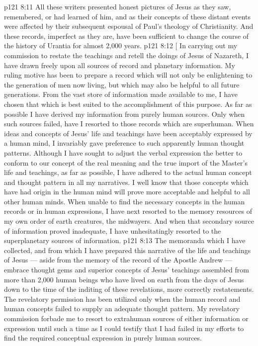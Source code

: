 \vs p121 8:11 \pc All these writers presented honest pictures of Jesus as they saw, remembered, or had learned of him, and as their concepts of these distant events were affected by their subsequent espousal of Paul’s theology of Christianity. And these records, imperfect as they are, have been sufficient to change the course of the history of Urantia for almost 2,000 years.
\vsetoff
\vs p121 8:12 [ In carrying out my commission to restate the teachings and retell the doings of Jesus of Nazareth, I have drawn freely upon all sources of record and planetary information. My ruling motive has been to prepare a record which will not only be enlightening to the generation of men now living, but which may also be helpful to all future generations. From the vast store of information made available to me, I have chosen that which is best suited to the accomplishment of this purpose. As far as possible I have derived my information from purely human sources. Only when such sources failed, have I resorted to those records which are superhuman. When ideas and concepts of Jesus’ life and teachings have been acceptably expressed by a human mind, I invariably gave preference to such apparently human thought patterns. Although I have sought to adjust the verbal expression the better to conform to our concept of the real meaning and the true import of the Master’s life and teachings, as far as possible, I have adhered to the actual human concept and thought pattern in all my narratives. I well know that those concepts which have had origin in the human mind will prove more acceptable and helpful to all other human minds. When unable to find the necessary concepts in the human records or in human expressions, I have next resorted to the memory resources of my own order of earth creatures, the midwayers. And when that secondary source of information proved inadequate, I have unhesitatingly resorted to the superplanetary sources of information.
\vs p121 8:13 The memoranda which I have collected, and from which I have prepared this narrative of the life and teachings of Jesus --- aside from the memory of the record of the Apostle Andrew --- embrace thought gems and superior concepts of Jesus’ teachings assembled from more than 2,000 human beings who have lived on earth from the days of Jesus down to the time of the inditing of these revelations, more correctly restatements. The revelatory permission has been utilized only when the human record and human concepts failed to supply an adequate thought pattern. My revelatory commission forbade me to resort to extrahuman sources of either information or expression until such a time as I could testify that I had failed in my efforts to find the required conceptual expression in purely human sources.
